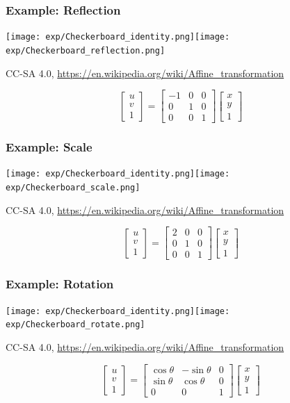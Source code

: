 \documentclass{beamer}
\begin{document}
\begin{frame}
  \frametitle{Example: Reflection}
  \centerline{\texttt{[image: exp/Checkerboard\_identity.png]}\texttt{[image: exp/Checkerboard\_reflection.png]}}
  \centerline{\small CC-SA 4.0, \url{https://en.wikipedia.org/wiki/Affine_transformation}}
  \[
  \left[\begin{array}{c} u\\v\\1\end{array}\right]=
  \left[\begin{array}{ccc}-1&0&0\\0&1&0\\0&0&1\end{array}\right]
  \left[\begin{array}{c}x\\y\\1\end{array}\right]
  \]
\end{frame}

\begin{frame}
  \frametitle{Example: Scale}
  \centerline{\texttt{[image: exp/Checkerboard\_identity.png]}\texttt{[image: exp/Checkerboard\_scale.png]}}
  \centerline{\small CC-SA 4.0, \url{https://en.wikipedia.org/wiki/Affine_transformation}}
  \[
  \left[\begin{array}{c} u\\v\\1\end{array}\right]=
  \left[\begin{array}{ccc}2&0&0\\0&1&0\\0&0&1\end{array}\right]
  \left[\begin{array}{c}x\\y\\1\end{array}\right]
  \]
\end{frame}

\begin{frame}
  \frametitle{Example: Rotation}
  \centerline{\texttt{[image: exp/Checkerboard\_identity.png]}\texttt{[image: exp/Checkerboard\_rotate.png]}}
  \centerline{\small CC-SA 4.0, \url{https://en.wikipedia.org/wiki/Affine_transformation}}
  \[
  \left[\begin{array}{c} u\\v\\1\end{array}\right]=
  \left[\begin{array}{ccc}\cos\theta&-\sin\theta&0\\\sin\theta&\cos\theta&0\\0&0&1\end{array}\right]
  \left[\begin{array}{c}x\\y\\1\end{array}\right]
  \]
\end{frame}
\end{document}
